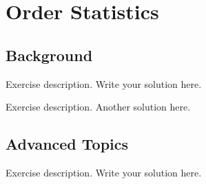 \section{Order Statistics}

\subsection{Background}

\exercise
Exercise description.
\solution
Write your solution here.

\exercise
Exercise description.
\solution
Another solution here.

\subsection{Advanced Topics}

\exercise
Exercise description.
\solution
Write your solution here.
